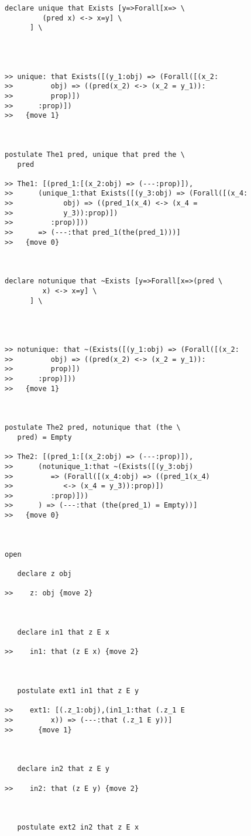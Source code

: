 \documentclass{article}
\begin{document}
\begin{verbatim}
declare unique that Exists [y=>Forall[x=> \
         (pred x) <-> x=y] \
      ] \
   



>> unique: that Exists([(y_1:obj) => (Forall([(x_2:
>>         obj) => ((pred(x_2) <-> (x_2 = y_1)):
>>         prop)])
>>      :prop)])
>>   {move 1}



postulate The1 pred, unique that pred the \
   pred

>> The1: [(pred_1:[(x_2:obj) => (---:prop)]),
>>      (unique_1:that Exists([(y_3:obj) => (Forall([(x_4:
>>            obj) => ((pred_1(x_4) <-> (x_4 =
>>            y_3)):prop)])
>>         :prop)]))
>>      => (---:that pred_1(the(pred_1)))]
>>   {move 0}



declare notunique that ~Exists [y=>Forall[x=>(pred \
         x) <-> x=y] \
      ] \
   



>> notunique: that ~(Exists([(y_1:obj) => (Forall([(x_2:
>>         obj) => ((pred(x_2) <-> (x_2 = y_1)):
>>         prop)])
>>      :prop)]))
>>   {move 1}



postulate The2 pred, notunique that (the \
   pred) = Empty

>> The2: [(pred_1:[(x_2:obj) => (---:prop)]),
>>      (notunique_1:that ~(Exists([(y_3:obj)
>>         => (Forall([(x_4:obj) => ((pred_1(x_4)
>>            <-> (x_4 = y_3)):prop)])
>>         :prop)]))
>>      ) => (---:that (the(pred_1) = Empty))]
>>   {move 0}



open

   declare z obj

>>    z: obj {move 2}



   declare in1 that z E x

>>    in1: that (z E x) {move 2}



   postulate ext1 in1 that z E y

>>    ext1: [(.z_1:obj),(in1_1:that (.z_1 E
>>         x)) => (---:that (.z_1 E y))]
>>      {move 1}



   declare in2 that z E y

>>    in2: that (z E y) {move 2}



   postulate ext2 in2 that z E x


\end{verbatim}
\end{document}
